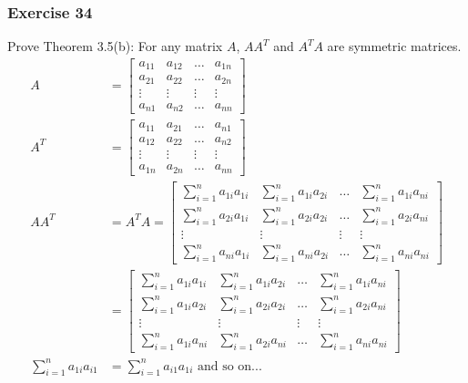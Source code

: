 \documentclass{math}
\begin{document}
\subsubsection*{Exercise 34}
Prove Theorem 3.5(b): For any matrix \( A \), \( AA^T \) and \( A^TA \) are
symmetric matrices.
\begin{align*}
  A &= \begin{bmatrix}
    a_{11} & a_{12} & \dots & a_{1n} \\
    a_{21} & a_{22} & \dots & a_{2n} \\
    \vdots & \vdots & \vdots & \vdots \\
    a_{n1} & a_{n2} & \dots & a_{nn}
  \end{bmatrix} \\
  A^T &= \begin{bmatrix}
    a_{11} & a_{21} & \dots & a_{n1} \\
    a_{12} & a_{22} & \dots & a_{n2} \\
    \vdots & \vdots & \vdots & \vdots \\
    a_{1n} & a_{2n} & \dots & a_{nn}
  \end{bmatrix} \\
  AA^T &= A^TA = \begin{bmatrix}
    \sum_{i=1}^{n}a_{1i}a_{1i} & \sum_{i=1}^{n}a_{1i}a_{2i} & \dots &
      \sum_{i=1}^{n}a_{1i}a_{ni} \\[1em]
    \sum_{i=1}^{n}a_{2i}a_{1i} & \sum_{i=1}^{n}a_{2i}a_{2i} & \dots &
      \sum_{i=1}^{n}a_{2i}a_{ni} \\[1em]
    \vdots & \vdots & \vdots & \vdots \\[1em]
    \sum_{i=1}^{n}a_{ni}a_{1i} & \sum_{i=1}^{n}a_{ni}a_{2i} & \dots &
      \sum_{i=1}^{n}a_{ni}a_{ni}
  \end{bmatrix} \\
  &= \begin{bmatrix}
    \sum_{i=1}^{n}a_{1i}a_{1i} & \sum_{i=1}^{n}a_{1i}a_{2i} & \dots &
      \sum_{i=1}^{n}a_{1i}a_{ni} \\[1em]
    \sum_{i=1}^{n}a_{1i}a_{2i} & \sum_{i=1}^{n}a_{2i}a_{2i} & \dots &
      \sum_{i=1}^{n}a_{2i}a_{ni} \\[1em]
    \vdots & \vdots & \vdots & \vdots \\[1em]
    \sum_{i=1}^{n}a_{1i}a_{ni} & \sum_{i=1}^{n}a_{2i}a_{ni} & \dots &
      \sum_{i=1}^{n}a_{ni}a_{ni}
  \end{bmatrix} \\
  \sum_{i=1}^{n}a_{1i}a_{i1} &= \sum_{i=1}^{n}a_{i1}a_{1i} \text{ and so on...}
\end{align*}
\end{document}
